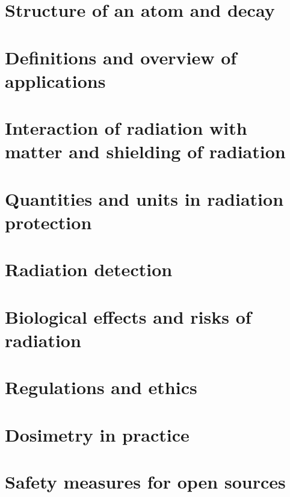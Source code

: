 \documentclass{report}
\begin{document}
\chapter{Structure of an atom and decay}
\chapter{Definitions and overview of applications}
\chapter{Interaction of radiation with matter and shielding of radiation}
\chapter{Quantities and units in radiation protection}
\chapter{Radiation detection}
\chapter{Biological effects and risks of radiation}
\chapter{Regulations and ethics}
\chapter{Dosimetry in practice}
\chapter{Safety measures for open sources}
\end{document}
